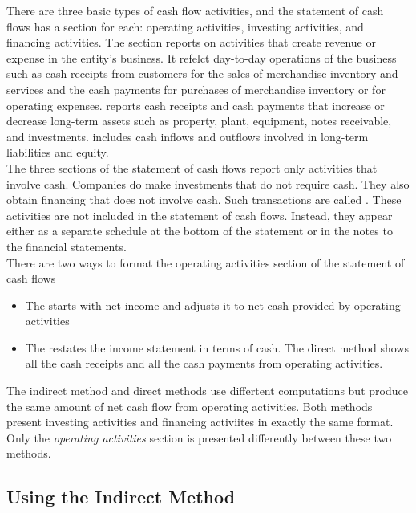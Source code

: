 \documentclass{article}
\begin{document}
There are three basic types of cash flow activities, and the statement of cash flows has a section for each: operating activities, investing activities, and financing activities. The  section reports on activities that create revenue or expense in the entity's business. It refelct day-to-day operations of the business such as cash receipts from customers for the sales of merchandise inventory and services and the cash payments for purchases of merchandise inventory or for operating expenses.  reports cash receipts and cash payments that increase or decrease long-term assets such as property, plant, equipment, notes receivable, and investments.  includes cash inflows and outflows involved in long-term liabilities and equity. \\ 

The three sections of the statement of cash flows report only activities that involve cash. Companies do make investments that do not require cash. They also obtain financing that does not involve cash. Such transactions are called . These activities are not included in the statement of cash flows. Instead, they appear either as a separate schedule at the bottom of the statement or in the notes to the financial statements. \\ 

There are two ways to format the operating activities section of the statement of cash flows 
\begin{itemize}
  \item The  starts with net income and adjusts it to net cash provided by operating activities 
  \item The  restates the income statement in terms of cash. The direct method shows all the cash receipts and all the cash payments from operating activities. 
\end{itemize}
The indirect method and direct methods use differtent computations but produce the same amount of net cash flow from operating activities. Both methods present investing activities and financing activiites in exactly the same format. Only the \emph{operating activities} section is presented differently between these two methods. 

\subsection{Using the Indirect Method}
\end{document}

